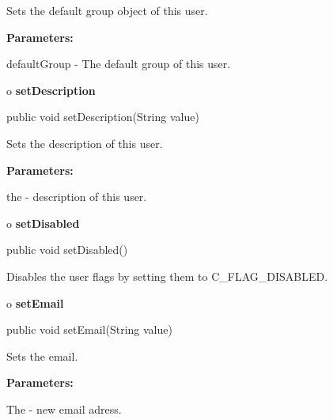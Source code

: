 \begin{description}
\htmlDD Sets the default group object of this user. 

\begin{description}
\item {\bf Parameters:}  

defaultGroup - The default group of this user.  
\end{description}

\end{description}

o {\bf setDescription} 

\begin{PRE}
 public void setDescription(String value)
\end{PRE}

\begin{description}
\htmlDD Sets the description of this user. 

\begin{description}
\item {\bf Parameters:}  

the - description of this user.  
\end{description}

\end{description}

o {\bf setDisabled} 

\begin{PRE}
 public void setDisabled()
\end{PRE}

\begin{description}
\htmlDD Disables the user flags by setting them to C\_FLAG\_DISABLED. 

\end{description}

o {\bf setEmail} 

\begin{PRE}
 public void setEmail(String value)
\end{PRE}

\begin{description}
\htmlDD Sets the email. 

\begin{description}
\item {\bf Parameters:}  

The - new email adress.  
\end{description}

\end{description}

